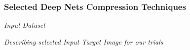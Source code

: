 
\begin{frame}
    \frametitle{Selected Deep Nets Compression Techniques}
        \begin{center}
            {\fontsize{40}{50}\selectfont \emph{Input Dataset}}
        \end{center}
        \begin{center}
            \emph{Describing selected Input Target Image for our trials}
        \end{center}
\end{frame}

